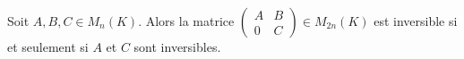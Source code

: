 Soit $A, B, C \in M_n(K)$. Alors la matrice $\begin{pmatrix} A & B \\ 0 & C \end{pmatrix} \in M_{2n}(K)$ est inversible si et seulement si $A$ et $C$ sont inversibles.

\begin{reponses}
\end{reponses}


